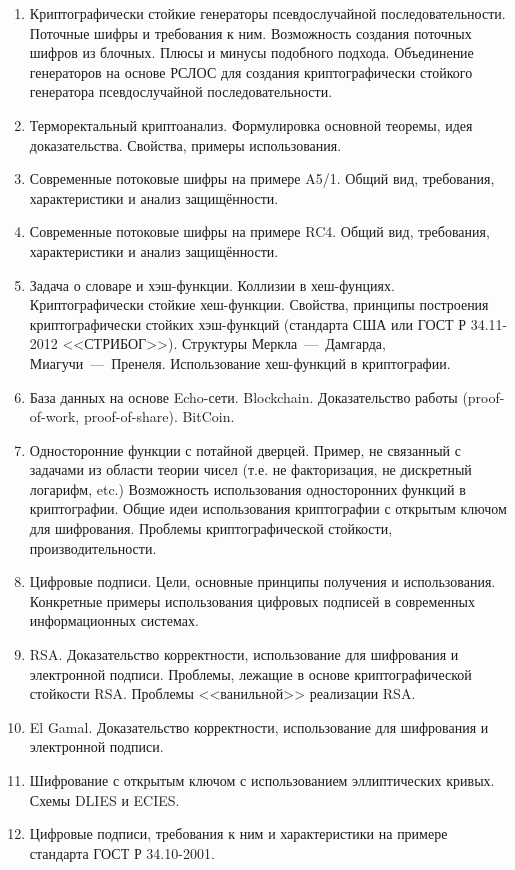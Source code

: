 \begin{enumerate}
    \item Криптографически стойкие генераторы псевдослучайной последовательности. Поточные шифры и требования к ним. Возможность создания поточных шифров из блочных. Плюсы и минусы подобного подхода. Объединение генераторов на основе РСЛОС для создания криптографически стойкого генератора псевдослучайной последовательности.
    \item Терморектальный криптоанализ. Формулировка основной теоремы, идея доказательства. Свойства, примеры использования.
    \item Современные потоковые шифры на примере A5/1. Общий вид, требования, характеристики и анализ защищённости.
    \item Современные потоковые шифры на примере RC4. Общий вид, требования, характеристики и анализ защищённости.
    \item Задача о словаре и хэш-функции. Коллизии в хеш-фунциях. Криптографически стойкие хеш-функции. Свойства, принципы построения криптографически стойких хэш-функций (стандарта США или ГОСТ Р 34.11-2012 <<СТРИБОГ>>). Структуры Меркла~---~Дамгарда, Миагучи~---~Пренеля. Использование хеш-функций в криптографии.
    \item База данных на основе Echo-сети. Blockchain. Доказательство работы (proof-of-work, proof-of-share). BitCoin.
    \item Односторонние функции с потайной дверцей. Пример, не связанный с задачами из области теории чисел (т.е. не факторизация, не дискретный логарифм, etc.) Возможность использования односторонних функций в криптографии. Общие идеи использования криптографии с открытым ключом для шифрования. Проблемы криптографической стойкости, производительности.
    \item Цифровые подписи. Цели, основные принципы получения и использования. Конкретные примеры использования цифровых подписей в современных информационных системах.
    \item RSA. Доказательство корректности, использование для шифрования и электронной подписи. Проблемы, лежащие в основе криптографической стойкости RSA. Проблемы <<ванильной>> реализации RSA.
    \item El Gamal. Доказательство корректности, использование для шифрования и электронной подписи.
    \item Шифрование с открытым ключом с использованием эллиптических кривых. Схемы DLIES и ECIES.
    \item Цифровые подписи, требования к ним и характеристики на примере стандарта ГОСТ Р 34.10-2001.

\end{enumerate}
